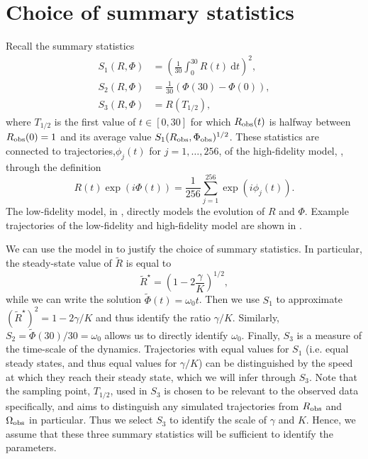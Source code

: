 \documentclass[supplement,review]{siamonline190516}
\begin{document}
\maketitle

\section{Choice of summary statistics}
\label{appendix:summary_statistics}

Recall the summary statistics
\begin{align*}
S_1(R, \Phi) &= \left( \frac{1}{30} \int_0^{30} R(t) ~\mathrm dt \right)^2, \\
S_2(R, \Phi) &= \frac{1}{30} \left( \Phi(30) - \Phi(0) \right), \\
S_3(R, \Phi) &= R \left( T_{1/2} \right),
\end{align*}
where $T_{1/2}$ is the first value of $t \in [0,30]$ for which $R_{\mathrm{obs}}(t)$ is halfway between $R_{\mathrm{obs}}(0)=1$ and its average value $S_1(R_{\mathrm{obs}}, \Phi_{\mathrm{obs}})^{1/2}$.
These statistics are connected to trajectories,$\phi_j(t)$ for $j =1,\dots,256$, of the high-fidelity model, , through the definition
\[
R(t) \exp (i \Phi(t)) = \frac{1}{256} \sum_{j=1}^{256} \exp(i \phi_j(t)).
\]
The low-fidelity model, in , directly models the evolution of $R$ and $\Phi$.
Example trajectories of the low-fidelity and high-fidelity model are shown in .

We can use the model in  to justify the choice of summary statistics.
In particular, the steady-state value of $\tilde R$ is equal to
\[
\tilde R^\star = \left( 1 - 2\frac{\gamma}{K} \right)^{1/2},
\]
while we can write the solution $\tilde \Phi(t) = \omega_0 t$.
Then we use $S_1$ to approximate $(\tilde R^\star)^2 = 1 - 2\gamma/K$ and thus identify the ratio $\gamma/K$.
Similarly, $S_2 = \tilde \Phi(30)/30 = \omega_0$ allows us to directly identify $\omega_0$.
Finally, $S_3$ is a measure of the time-scale of the dynamics.
Trajectories with equal values for $S_1$ (i.e. equal steady states, and thus equal values for $\gamma/K$) can be distinguished by the speed at which they reach their steady state, which we will infer through $S_3$.
Note that the sampling point, $T_{1/2}$, used in $S_3$ is chosen to be relevant to the observed data specifically, and aims to distinguish any simulated trajectories from $R_{\mathrm{obs}}$ and $\Omega_{\mathrm{obs}}$ in particular.
Thus we select $S_3$ to identify the scale of $\gamma$ and $K$.
Hence, we assume that these three summary statistics will be sufficient to identify the parameters.
\end{document}
